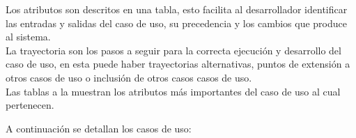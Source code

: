 Los atributos son descritos en una tabla, esto facilita al desarrollador identificar las entradas y salidas del caso de uso, su precedencia y los cambios que produce al sistema. \\

La trayectoria son los pasos a seguir para la correcta ejecución y desarrollo del caso de uso, en esta puede haber trayectorias alternativas, puntos de extensión a otros casos de uso o inclusión de otros casos casos de uso. \\

Las tablas  a la  muestran los atributos más importantes del caso de uso al cual pertenecen.

A continuación se detallan los casos de uso:


